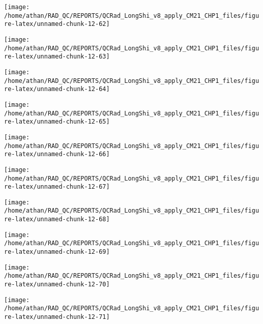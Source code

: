 \documentclass[
  10pt,
  a4paper,oneside]{article}
\begin{document}
\begin{center}\texttt{[image: /home/athan/RAD\_QC/REPORTS/QCRad\_LongShi\_v8\_apply\_CM21\_CHP1\_files/figure-latex/unnamed-chunk-12-62]} \end{center}

\begin{center}\texttt{[image: /home/athan/RAD\_QC/REPORTS/QCRad\_LongShi\_v8\_apply\_CM21\_CHP1\_files/figure-latex/unnamed-chunk-12-63]} \end{center}

\begin{center}\texttt{[image: /home/athan/RAD\_QC/REPORTS/QCRad\_LongShi\_v8\_apply\_CM21\_CHP1\_files/figure-latex/unnamed-chunk-12-64]} \end{center}

\begin{center}\texttt{[image: /home/athan/RAD\_QC/REPORTS/QCRad\_LongShi\_v8\_apply\_CM21\_CHP1\_files/figure-latex/unnamed-chunk-12-65]} \end{center}

\begin{center}\texttt{[image: /home/athan/RAD\_QC/REPORTS/QCRad\_LongShi\_v8\_apply\_CM21\_CHP1\_files/figure-latex/unnamed-chunk-12-66]} \end{center}

\begin{center}\texttt{[image: /home/athan/RAD\_QC/REPORTS/QCRad\_LongShi\_v8\_apply\_CM21\_CHP1\_files/figure-latex/unnamed-chunk-12-67]} \end{center}

\begin{center}\texttt{[image: /home/athan/RAD\_QC/REPORTS/QCRad\_LongShi\_v8\_apply\_CM21\_CHP1\_files/figure-latex/unnamed-chunk-12-68]} \end{center}

\begin{center}\texttt{[image: /home/athan/RAD\_QC/REPORTS/QCRad\_LongShi\_v8\_apply\_CM21\_CHP1\_files/figure-latex/unnamed-chunk-12-69]} \end{center}

\begin{center}\texttt{[image: /home/athan/RAD\_QC/REPORTS/QCRad\_LongShi\_v8\_apply\_CM21\_CHP1\_files/figure-latex/unnamed-chunk-12-70]} \end{center}

\begin{center}\texttt{[image: /home/athan/RAD\_QC/REPORTS/QCRad\_LongShi\_v8\_apply\_CM21\_CHP1\_files/figure-latex/unnamed-chunk-12-71]} \end{center}
\end{document}
